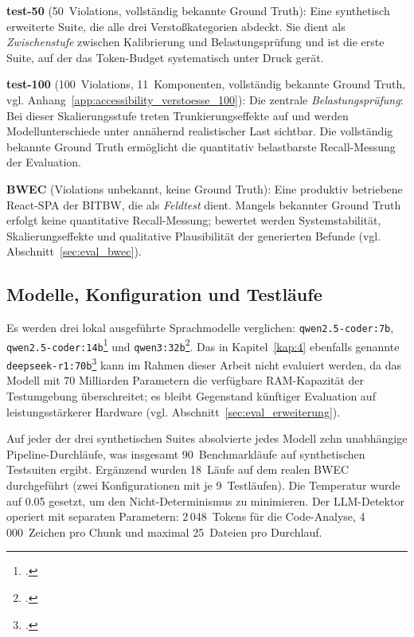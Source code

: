 \textbf{test-50} (50~Violations, vollständig bekannte Ground Truth): Eine synthetisch erweiterte Suite, die alle drei Verstoßkategorien abdeckt. Sie dient als \textit{Zwischenstufe} zwischen Kalibrierung und Belastungsprüfung und ist die erste Suite, auf der das Token-Budget systematisch unter Druck gerät.

\textbf{test-100} (100~Violations, 11~Komponenten, vollständig bekannte Ground Truth, vgl. Anhang~\ref{app:accessibility_verstoesse_100}): Die zentrale \textit{Belastungsprüfung}: Bei dieser Skalierungsstufe treten Trunkierungseffekte auf und werden Modellunterschiede unter annähernd realistischer Last sichtbar. Die vollständig bekannte Ground Truth ermöglicht die quantitativ belastbarste Recall-Messung der Evaluation.

\textbf{\ac{BWEC}} (Violations unbekannt, keine Ground Truth): Eine produktiv betriebene React-\ac{SPA} der \ac{BITBW}, die als \textit{Feldtest} dient. Mangels bekannter Ground Truth erfolgt keine quantitative Recall-Messung; bewertet werden Systemstabilität, Skalierungseffekte und qualitative Plausibilität der generierten Befunde (vgl. Abschnitt~\ref{sec:eval_bwec}).

\subsection{Modelle, Konfiguration und Testläufe}
\label{sec:versuch_modelle}

Es werden drei lokal ausgeführte Sprachmodelle verglichen: \texttt{qwen2.5-coder:7b}, \texttt{qwen2.5\allowbreak-coder:14b}\footcite[Vgl.][]{hui2024qwen25coder} und \texttt{qwen3:32b}\footcite[Vgl.][]{qwen3}. Das in Kapitel~\ref{kap:4} ebenfalls genannte \texttt{deepseek-r1:70b}\footcite[Vgl.][]{deepseek} kann im Rahmen dieser Arbeit nicht evaluiert werden, da das Modell mit 70 Milliarden Parametern die verfügbare \ac{RAM}-Kapazität der Testumgebung überschreitet; es bleibt Gegenstand künftiger Evaluation auf leistungsstärkerer Hardware (vgl. Abschnitt~\ref{sec:eval_erweiterung}).

Auf jeder der drei synthetischen Suites absolvierte jedes Modell zehn unabhängige Pipeline-Durchläufe, was insgesamt 90~Benchmarkläufe auf synthetischen Testsuiten ergibt. Ergänzend wurden 18~Läufe auf dem realen \ac{BWEC} durchgeführt (zwei Konfigurationen mit je 9~Testläufen). Die Temperatur wurde auf 0.05 gesetzt, um den Nicht-Determinismus zu minimieren. Der \ac{LLM}-Detektor operiert mit separaten Parametern: 2\,048~Tokens für die Code-Analyse, 4\,000~Zeichen pro Chunk und maximal 25~Dateien pro Durchlauf.

